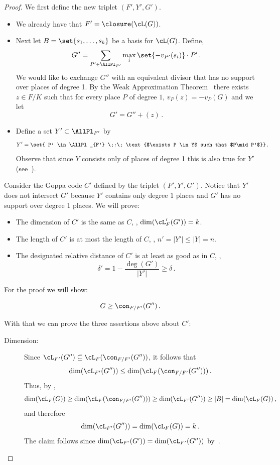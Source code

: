 \begin{proof}
%
%
%
%




We first define the new triplet $(F',Y',G')$.

\begin{itemize}
\item
We already have that $F' = \closure(\cL(G))$.

\item
Next let $B=\set{s_1,\ldots,s_{k}}$ be a basis for $\cL(G)$. Define,
$$G'' = \sum_{P' \in \AllPl_{F'}} \max_i
\set {-v_{P'}(s_i)} \cdot P'\,.$$ We would like to exchange $G''$ with
an equivalent divisor that has no support over places of degree 1.
By the Weak Approximation Theorem~\cite[Thm I.3.1]{S:93} there
exists $z\in F/K$ such that for every place $P$ of degree $1$,
$v_P(z) = -v_P(G)$ and we let $$G' = G'' + (z)\,.$$

\item
Define a set $Y' \subset \AllPl_{F'}$ by
$$ Y' = \set{ P' \in \AllPl_{F'} \;:\; \text{$\exists P \in Y$ such
    that $P\mid P'$}}\,.$$
Observe that since $Y$ consists only of places of degree 1 this is
also true for $Y'$ (see~\cite[Proposition III.1.6]{S:93}).
\end{itemize}

Consider the Goppa code $C'$ defined by the triplet $(F',Y',G')$.
Notice that $Y'$ does not intersect $G'$ because $Y'$ contains only
degree $1$ places and $G'$ has no support over degree $1$ places. We
will prove:
\begin{itemize}
  \item The dimension of $C'$ is the same as $C$, \ie, $\dim(\cL_F'(G'))=k$.
  \item The length of $C'$ is at most the length of $C$, \ie, $n'=|Y'| \le |Y| = n$.
  \item The designated relative distance of $C'$ is at least as good as in $C$, \ie,
$$\delta' = 1 - \frac{\deg(G')}{|Y'|} \ge \delta\,.$$
\end{itemize}

For the proof we will show:

\begin{claim}
\label{cl:conorm}
$$G \ge \con_{F/F'}(G'')\,.$$
\end{claim}

With that we can prove the three assertions above about $C'$:

\begin{description}
\item [Dimension:]
Since $\cL_{F'}(G'') \subseteq \cL_F(\con_{F/F'}(G''))$, it follows
that $$\dim(\cL_{F'}(G'')) \le \dim(\cL_F(\con_{F/F'}(G'')))\,.$$ Thus,
by ,
$$\dim(\cL_F(G)) \ge \dim( \cL_F(\con_{F/F'}(G''))) \ge \dim(\cL_{F'}(G'')) \ge
|B| = \dim(\cL_F(G))\,,$$ and therefore
$$\dim(\cL_{F'}(G''))=\dim(\cL_F(G))=k\,.$$
The claim follows since $\dim(\cL_{F'}(G'))=\dim(\cL_{F'}(G''))$ by~\cite[Lemma I.4.6]{S:93}.


\end{description}
\end{proof}

